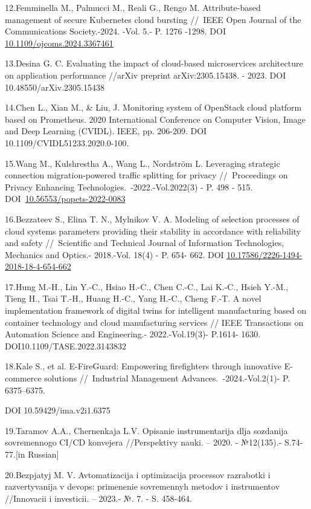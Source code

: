 \documentclass[
]{article}
\begin{document}
12.Femminella M., Palmucci M., Reali G., Rengo M. Attribute-based
management of secure Kubernetes cloud bursting //~IEEE Open Journal of
the Communications Society.-2024. -Vol. 5.- P. 1276 -1298. DOI
\href{https://doi.org/10.1109/ojcoms.2024.3367461}{10.1109/ojcoms.2024.3367461}

13.Desina G. C. Evaluating the impact of cloud-based microservices
architecture on application performance //arXiv preprint
arXiv:2305.15438. - 2023. DOI 10.48550/arXiv.2305.15438

14.Chen L., Xian M., \& Liu, J. Monitoring system of OpenStack cloud
platform based on Prometheus. 2020 International Conference on Computer
Vision, Image and Deep Learning (CVIDL). IEEE, pp. 206-209. DOI
10.1109/CVIDL51233.2020.0-100.

15.Wang M., Kulshrestha A., Wang L., Nordström L. Leveraging strategic
connection migration-powered traffic splitting for privacy
//~Proceedings on Privacy Enhancing Technologies.~-2022.-Vol.2022(3) -
P. 498 - 515.
DOI~\href{https://doi.org/10.56553/popets-2022-0083}{10.56553/popets-2022-0083}

16.Bezzateev S., Elina T. N., Mylnikov V. A. Modeling of selection
processes of cloud systems parameters providing their stability in
accordance with reliability and safety //~Scientific and Technical
Journal of Information Technologies, Mechanics and Optics.- 2018.-Vol.
18(4) - P. 654- 662. DOI
\href{https://doi.org/10.17586/2226-1494-2018-18-4-654-662}{10.17586/2226-1494-2018-18-4-654-662}

17.Hung M.-H., Lin Y.-C., Hsiao H.-C., Chen C.-C., Lai K.-C., Hsieh
Y.-M., Tieng H., Tsai T.-H., Huang H.-C., Yang H.-C., Cheng F.-T. A
novel implementation framework of digital twins for intelligent
manufacturing based on container technology and cloud manufacturing
services // IEEE Transactions on Automation Science and Engineering.-
2022.-Vol.19(3)- P.1614- 1630. DOI10.1109/TASE.2022.3143832

18.Kale S., et al. E-FireGuard: Empowering firefighters through
innovative E-commerce solutions //~Industrial Management
Advances.~-2024.-Vol.2(1)- P. 6375--6375.

DOI 10.59429/ima.v2i1.6375

19.Taramov A.A., Chernen\textquotesingle kaja L.V. Opisanie
instrumentarija dlja sozdanija sovremennogo CI/CD konvejera
//Perspektivy nauki. -- 2020. - №12(135).- S.74-77.{[}in Russian{]}

20.Bezpjatyj M. V. Avtomatizacija i optimizacija processov razrabotki i
razvertyvanija v devops: primenenie sovremennyh metodov i instrumentov
//Innovacii i investicii. -- 2023.- №. 7. - S. 458-464.
\end{document}
